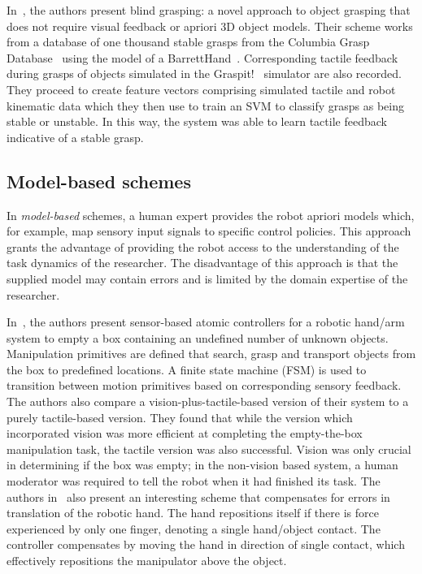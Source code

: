 In~\cite{dang2011blind}, the authors present blind grasping: a novel approach to object grasping that does not require visual feedback or apriori 3D object models.
Their scheme works from a database of one thousand stable grasps from the Columbia Grasp Database~\cite{goldfeder2009columbia} using the model of a BarrettHand~\cite{townsend2000barretthand}. 
Corresponding tactile feedback during grasps of objects simulated in the Graspit!~\cite{miller2004graspit} simulator are also recorded.
They proceed to create feature vectors comprising simulated tactile and robot kinematic data which they then use to train an SVM to classify grasps as being stable or unstable. 
In this way, the system was able to learn tactile feedback indicative of a stable grasp.

\subsection{Model-based schemes}

In \emph{model-based} schemes, a human expert provides the robot apriori models which, for example, map sensory input signals to specific control policies. 
This approach grants the advantage of providing the robot access to the understanding of the task dynamics of the researcher.
The disadvantage of this approach is that the supplied model may contain errors and is limited by the domain expertise of the researcher.

In~\cite{felip2011emptying}, the authors present sensor-based atomic controllers for a robotic hand/arm system to empty a box containing an undefined number of unknown objects.
Manipulation primitives are defined that search, grasp and transport objects from the box to predefined locations.
A finite state machine (FSM) is used to transition between motion primitives based on corresponding sensory feedback.
The authors also compare a vision-plus-tactile-based version of their system to a purely tactile-based version.
They found that while the version which incorporated vision was more efficient at completing the empty-the-box manipulation task, the tactile version was also successful.
Vision was only crucial in determining if the box was empty; in the non-vision based system, a human moderator was required to tell the robot when it had finished its task.
The authors in~\cite{felip2011emptying} also present an interesting scheme that compensates for errors in translation of the robotic hand.
The hand repositions itself if there is force experienced by only one finger, denoting a single hand/object contact.
The controller compensates by moving the hand in direction of single contact, which effectively repositions the manipulator above the object.

